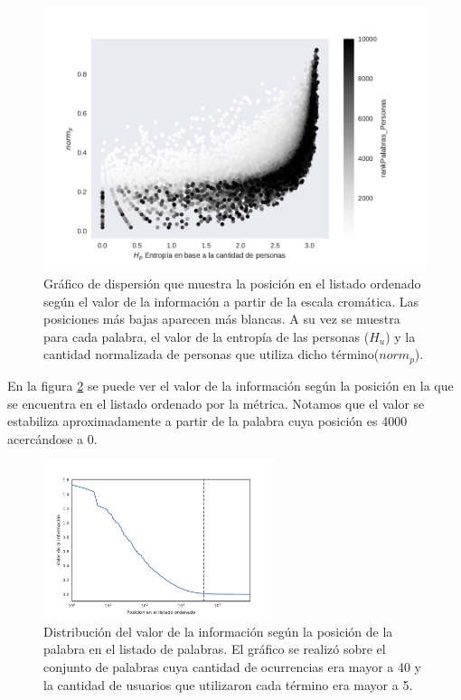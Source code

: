 \begin{figure}[ht]
\centering
\includegraphics[width=1.0\textwidth]{./images/entropiaPersonasxNormCantPersonas.pdf}
\caption{Gráfico de dispersión que muestra la posición en el listado ordenado según el valor de la información a partir de la escala cromática. Las posiciones más bajas aparecen más blancas. A su vez se muestra para cada palabra, el valor de la entropía de las personas ($H_u$) y la cantidad normalizada de personas que utiliza dicho término($norm_p$). } 
\label{fig:infoValue} 
\end{figure}

En la figura \ref{fig:ivalue} se puede ver el valor de la información según la posición en la que se encuentra en el listado ordenado por la métrica. Notamos que el valor se estabiliza aproximadamente a partir de la palabra cuya posición es 4000 acercándose a 0.


\begin{figure}[ht]
\centering
\includegraphics[width=0.6\textwidth]{./images/train/conFiltro/valorInformacionCorte.pdf}
\caption{Distribución del valor de la información según la posición de la palabra en el listado de palabras. El gráfico se realizó sobre el conjunto de palabras cuya cantidad de ocurrencias era mayor a 40 y la cantidad de usuarios que utilizaron cada término era mayor a 5. } 
\label{fig:ivalue}
\end{figure}


